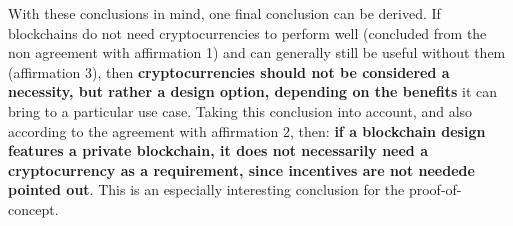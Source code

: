 With these conclusions in mind, one final conclusion can be derived. If blockchains do not need cryptocurrencies to perform well (concluded from the non agreement with affirmation 1) and can generally still be useful without them (affirmation 3), then \textbf{cryptocurrencies should not be considered a necessity, but rather a design option, depending on the benefits} it can bring to a particular use case. Taking this conclusion into account, and also according to the agreement with affirmation 2, then: \textbf{if a blockchain design features a private blockchain, it does not necessarily need a cryptocurrency as a requirement, since incentives are not needede pointed out}. This is an especially interesting conclusion for the proof-of-concept.

